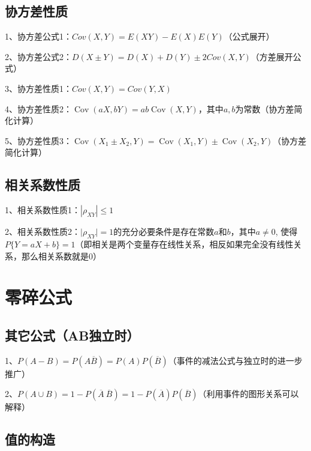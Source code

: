 \subsection{协方差性质}

1、协方差公式1：$ C o v ( X , Y ) = E ( X Y ) - E ( X ) E ( Y )  $（公式展开）

2、协方差公式2：$ D ( X \pm Y ) = D ( X ) + D ( Y ) \pm 2 Cov ( X , Y )   $（方差展开公式）

3、协方差性质1：$ Cov(X, Y)=Cov(Y, X) $

4、协方差性质2：$ \operatorname{Cov}(a X, b Y)=a b \operatorname{Cov}(X, Y) $，其中$ a,b $为常数（协方差简化计算）

5、协方差性质3：$ \operatorname{Cov}\left(X_{1}\pm X_{2}, Y\right)=\operatorname{Cov}\left(X_{1}, Y\right)\pm \operatorname{Cov}\left(X_{2}, Y\right) $（协方差简化计算）



\subsection{相关系数性质}

1、相关系数性质1：$ \left|\rho_{X Y}\right| \leqslant 1 $

2、相关系数性质2：$ \mid \rho_{X Y} \mid=1 $的充分必要条件是存在常数$ a $和$ b $，其中$ a \neq 0 $, 使得$ P\{Y=a X+b\}=1 $（即相关是两个变量存在线性关系，相反如果完全没有线性关系，那么相关系数就是0）

\section{零碎公式}



\subsection{其它公式（AB独立时）}

1、$ P(A-B) = P(A\overline B)=P(A)P(\overline B) $（事件的减法公式与独立时的进一步推广）

2、$ P(A\cup B) = 1-P(\overline A \  \overline B) = 1-P(\overline A)P(  \overline B) $（利用事件的图形关系可以解释）



\subsection{值的构造}

